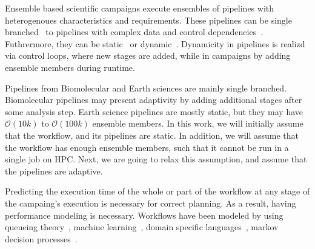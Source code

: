 %
%

Ensemble based scientific campaigns execute ensembles of pipelines with 
heterogenoues characteristics and requirements. These pipelines can be single 
branched~\cite{paraskevakos2019workflow,dakka2018high,ramakrishnan_survey,
balasubramanian2018harnessing} to pipelines with complex data and control 
dependencies~\cite{ramakrishnan_survey,deelman2018future}. Futhrermore, they 
can be static~\cite{paraskevakos2019workflow} or dynamic~\cite{dakka2018high,
balasubramanian2018harnessing}. Dynamicity in pipelines is realizd via control 
loops, where new stages are added, while in campaigns by adding ensemble 
members during runtime.

Pipelines from Biomolecular and Earth sciences are mainly single branched. 
Biomolecular pipelines may present adaptivity by adding additional stages after 
some analysis step. Earth science pipelines are mostly static, but they may 
have $\mathcal{O}(10k)$ to $\mathcal{O}(100k)$ ensemble members. In this work, 
we will initially assume that the workflow, and its pipelines are static. In 
addition, we will assume that the workflow has enough ensemble members, such 
that it cannot be run in a single job on HPC. Next, we are going to relax this 
assumption, and assume that the pipelines are adaptive.


Predicting the execution time of the whole or part of the workflow at any stage 
of the campaing's execution is necessary for correct planning. As a result, 
having performance modeling is necessary. Workflows have been modeled by using 
queueing theory~\cite{bao2019performance,yao2019throughput}, machine 
learning~\cite{witt2019predictive,pumma2017runtime}, domain specific 
languages~\cite{deelman2017performance,mandal2016toward}, markov decision 
processes~\cite{jia2005cost}.

